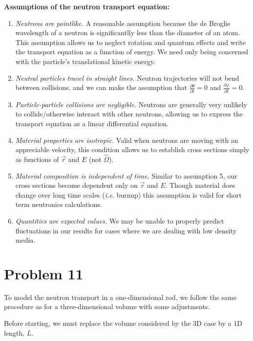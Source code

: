 \documentclass{article}
\begin{document}
\textbf{Assumptions of the neutron transport equation:}
\begin{enumerate}
	\item \textit{Neutrons are pointlike.} A reasonable assumption because the de Broglie wavelength of a neutron is significantlly less than the diameter of an atom. This assumption allows us to neglect rotation and quantum effects and write the transport equation as a function of energy. We need only being concerned with the particle's translational kinetic energy.
	\item \textit{Neutral particles travel in straight lines.} Neutron trajectories will not bend between collisions, and we can make the assumption that $\frac{\partial \theta}{\partial t} = 0$ and $\frac{\partial \varphi}{\partial t} = 0$.
	\item \textit{Particle-particle collisions are negligible.} Neutrons are generally very unlikely to collide/otherwise interact with other neutrons, allowing us to express the transport equation as a linear differential equation.
	\item \textit{Material properties are isotropic.} Valid when neutrons are moving with an appreciable velocity, this condition allows us to establish cross sections simply as functions of $\vec{r}$ and $E$ (not $\hat{\Omega}$).
	\item \textit{Material composition is independent of time.} Similar to assumption 5, our cross sections become dependent only on $\vec{r}$ and $E$. Though material does change over long time scales (\textit{i.e.} burnup) this assumption is valid for short term neutronics calculations.
	\item \textit{Quantities are expected values.} We may be unable to properly predict fluctuations in our results for cases where we are dealing with low density media.

\end{enumerate}




\section*{Problem 11}

To model the neutron transport in a one-dimensional rod, we follow the same procedure as for a three-dimensional volume with some adjustments.

Before starting, we must replace the volume considered by the 3D case by a 1D length, $L$. 
\end{document}
